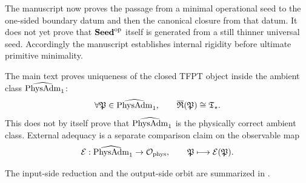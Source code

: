 \begin{remark}
The manuscript now proves the passage from a minimal operational seed to the one-sided boundary
datum and then the canonical closure from that datum. It does not yet prove that $\mathbf{Seed}^{\mathrm{op}}$ itself is
generated from a still thinner universal seed. Accordingly the manuscript establishes internal
rigidity before ultimate primitive minimality.
\end{remark}

\begin{remark}
The main text proves uniqueness of the closed TFPT object inside the ambient class $\widehat{\mathrm{PhysAdm}}_1$:
\[
\forall \mathfrak P\in\widehat{\mathrm{PhysAdm}}_1,\qquad
\overline{\mathfrak R}(\mathfrak P)\cong \mathfrak T_{\star}.
\]
This does not by itself prove that $\widehat{\mathrm{PhysAdm}}_1$ is the physically correct ambient class. External
adequacy is a separate comparison claim on the observable map
\[
\mathcal E:\widehat{\mathrm{PhysAdm}}_1\to\mathcal O_{\mathrm{phys}},
\qquad
\mathfrak P\longmapsto \mathcal E(\mathfrak P).
\]
\end{remark}

The input-side reduction and the output-side orbit are summarized in
.

